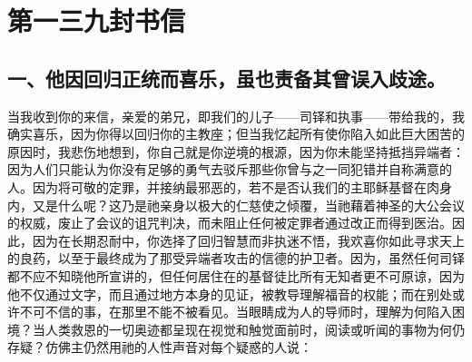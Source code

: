 

\section{第一三九封书信}

\par


\subsection{一、他因回归正统而喜乐，虽也责备其曾误入歧途。}

\par

当我收到你的来信，亲爱的弟兄，即我们的儿子——司铎和执事——带给我的，我确实喜乐，因为你得以回归你的主教座；但当我忆起所有使你陷入如此巨大困苦的原因时，我悲伤地想到，你自己就是你逆境的根源，因为你未能坚持抵挡异端者：因为人们只能认为你没有足够的勇气去驳斥那些你曾与之一同犯错并自称满意的人。因为将可敬的定罪，并接纳最邪恶的，若不是否认我们的主耶稣基督在肉身内，又是什么呢？这乃是祂亲身以极大的仁慈使之倾覆，当祂藉着神圣的大公会议的权威，废止了会议的诅咒判决，而未阻止任何被定罪者通过改正而得到医治。因此，因为在长期忍耐中，你选择了回归智慧而非执迷不悟，我欢喜你如此寻求天上的良药，以至于最终成为了那受异端者攻击的信德的护卫者。因为，虽然任何司铎都不应不知晓他所宣讲的，但任何居住在的基督徒比所有无知者更不可原谅，因为他不仅通过文字，而且通过地方本身的见证，被教导理解福音的权能；而在别处或许不可不信的事，在那里不能不被看见。当眼睛成为人的导师时，理解为何陷入困境？当人类救恩的一切奥迹都呈现在视觉和触觉面前时，阅读或听闻的事物为何仍存疑？仿佛主仍然用祂的人性声音对每个疑惑的人说：\par

